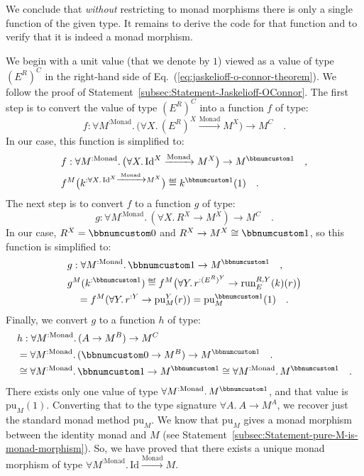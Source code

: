 We conclude that \emph{without} restricting to monad morphisms there
is only a single function of the given type. It remains to derive
the code for that function and to verify that it is indeed a monad
morphism.

We begin with a unit value (that we denote by $1$) viewed as a value
of type $(E^{R})^{C}$ in the right-hand side of Eq.~(\ref{eq:jaskelioff-o-connor-theorem}).
We follow the proof of Statement~\ref{subsec:Statement-Jaskelioff-OConnor}.
The first step is to convert the value of type $(E^{R})^{C}$ into
a function $f$ of type:
\[
f:\forall M^{:\text{Monad}}.\,\big(\forall X.\,(E^{R})^{X}\xrightarrow{\text{Monad}}M^{X}\big)\rightarrow M^{C}\quad.
\]
In our case, this function is simplified to:
\begin{align*}
 & f:\forall M^{:\text{Monad}}.\,\big(\forall X.\,\text{Id}^{X}\xrightarrow{\text{Monad}}M^{X}\big)\rightarrow M^{\bbnum 1}\quad,\\
 & f^{M}\big(k^{:\forall X.\,\text{Id}^{X}\xrightarrow{\text{Monad}}M^{X}}\big)\triangleq k^{\bbnum 1}(1)\quad.
\end{align*}
The next step is to convert $f$ to a function $g$ of type:
\[
g:\forall M^{:\text{Monad}}.\,(\forall X.\,R^{X}\rightarrow M^{X})\rightarrow M^{C}\quad.
\]
In our case, $R^{X}=\bbnum 0$ and $R^{X}\rightarrow M^{X}\cong\bbnum 1$,
so this function is simplified to: 
\begin{align*}
 & g:\forall M^{:\text{Monad}}.\,\bbnum 1\rightarrow M^{\bbnum 1}\quad,\\
 & g^{M}(k^{:\bbnum 1})\triangleq f^{M}\big(\forall Y.\,r^{:(E^{R})^{Y}}\rightarrow\text{run}_{E}^{R,Y}(k)(r)\big)\\
 & \quad=f^{M}(\forall Y.\,r^{:Y}\rightarrow\text{pu}_{M}^{Y}(r))=\text{pu}_{M}^{\bbnum 1}(1)\quad.
\end{align*}
Finally, we convert $g$ to a function $h$ of type:
\begin{align*}
 & h:\forall M^{:\text{Monad}}.\,(A\rightarrow M^{B})\rightarrow M^{C}\\
 & =\forall M^{:\text{Monad}}.\,(\bbnum 0\rightarrow M^{B})\rightarrow M^{\bbnum 1}\quad.\\
 & \cong\forall M^{:\text{Monad}}.\,\bbnum 1\rightarrow M^{\bbnum 1}\cong\forall M^{:\text{Monad}}.\,M^{\bbnum 1}\quad.
\end{align*}
 There exists only one value of type $\forall M^{:\text{Monad}}.\,M^{\bbnum 1}$,
and that value is $\text{pu}_{M}(1)$. Converting that to the type
signature $\forall A.\:A\rightarrow M^{A}$, we recover just the standard
monad method $\text{pu}_{M}$. We know that $\text{pu}_{M}$ gives
a monad morphism between the identity monad and $M$ (see Statement~\ref{subsec:Statement-pure-M-is-monad-morphism}).
So, we have proved that there exists a unique monad morphism of type
$\forall M^{:\text{Monad}}.\,\text{Id}\xrightarrow{\text{Monad}}M$. 

